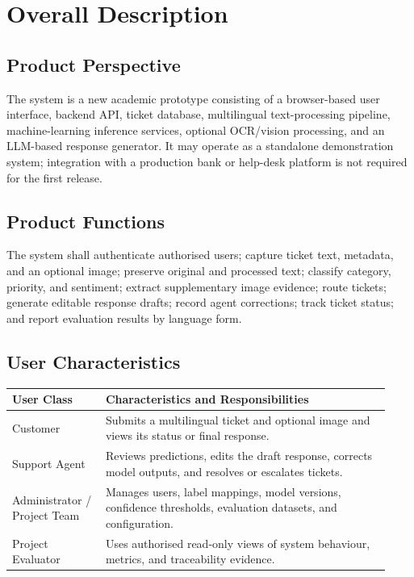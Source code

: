 \documentclass[10pt,letterpaper]{article}
\newenvironment{templatebody}{\par\justifying\setlength{\emergencystretch}{3em}}{\par}
\begin{document}
\begin{templatebody}
\section{Overall Description}

\subsection*{Product Perspective}
The system is a new academic prototype consisting of a browser-based user interface, backend API, ticket database, multilingual text-processing pipeline, machine-learning inference services, optional OCR/vision processing, and an LLM-based response generator. It may operate as a standalone demonstration system; integration with a production bank or help-desk platform is not required for the first release.

\subsection*{Product Functions}
The system shall authenticate authorised users; capture ticket text, metadata, and an optional image; preserve original and processed text; classify category, priority, and sentiment; extract supplementary image evidence; route tickets; generate editable response drafts; record agent corrections; track ticket status; and report evaluation results by language form.

\subsection*{User Characteristics}
\begin{longtable}{p{0.23\linewidth}p{0.70\linewidth}}
\toprule
\textbf{User Class} & \textbf{Characteristics and Responsibilities}\\
\midrule
Customer & Submits a multilingual ticket and optional image and views its status or final response.\\
Support Agent & Reviews predictions, edits the draft response, corrects model outputs, and resolves or escalates tickets.\\
Administrator / Project Team & Manages users, label mappings, model versions, confidence thresholds, evaluation datasets, and configuration.\\
Project Evaluator & Uses authorised read-only views of system behaviour, metrics, and traceability evidence.\\
\bottomrule
\end{longtable}


\end{templatebody}
\end{document}
